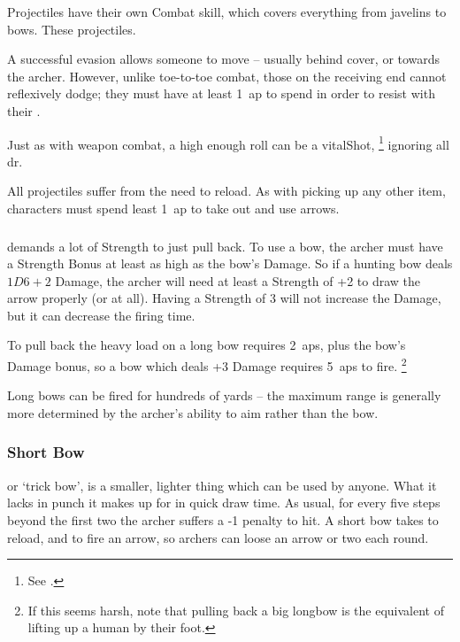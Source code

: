 \begin{multicols}{2}

\noindent
Projectiles have their own Combat \gls{skill}, which covers everything from javelins to bows.
These \glsdesc{projectiles}.

A successful evasion allows someone to move -- usually behind cover, or towards the archer.
However, unlike toe-to-toe combat, those on the receiving end cannot reflexively dodge; they must have at least 1~\gls{ap} to spend in order to resist with their .

Just as with weapon combat, a high enough roll can be a \gls{vitalShot},%
\footnote{See .}
ignoring all \gls{dr}.

All projectiles suffer from the need to reload.
As with picking up any other item, characters must spend least 1~\gls{ap} to take out and use arrows.

\subsubsection{}
\label{longbow}
demands a lot of Strength to just pull back.
To use a bow, the archer must have a Strength Bonus at least as high as the bow's Damage.
So if a hunting bow deals $1D6+2$ Damage, the archer will need at least a Strength of +2 to draw the arrow properly (or at all).
Having a Strength of 3 will not increase the Damage, but it can decrease the firing time.

To pull back the heavy load on a long bow requires 2~\glspl{ap}, plus the bow's Damage bonus, so a bow which deals +3 Damage requires 5~\glspl{ap} to fire.%
\footnote{If this seems harsh, note that pulling back a big longbow is the equivalent of lifting up a human by their foot.}

Long bows can be fired for hundreds of yards -- the maximum range is generally more determined by the archer's ability to aim rather than the bow.

\subsubsection{Short Bow}
or `trick bow', is a smaller, lighter thing which can be used by anyone.
What it lacks in punch it makes up for in quick draw time.
As usual, for every five steps beyond the first two the archer suffers a -1 penalty to hit.
A short bow takes  to reload, and  to fire an arrow, so archers can loose an arrow or two each round.


\end{multicols}
